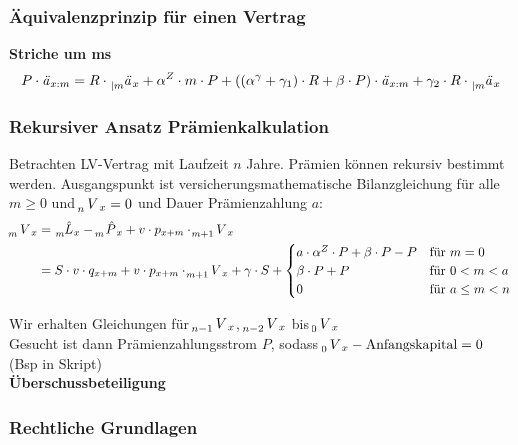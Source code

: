 \documentclass[12pt]{report}
\theoremstyle{dotless}
\theoremstyle{definition}
\begin{document}
\subsubsection{Äquivalenzprinzip für einen Vertrag}
\textbf{Striche um ms}
\begin{equation}
P \cdot \text{\textit{ä}}_{x:m} = R \cdot \tensor[_{|m}]{\text{\textit{ä}}}{}_x + \alpha^Z \cdot m \cdot P + ((\alpha^\gamma + \gamma_1)\cdot R + \beta \cdot P) \cdot \text{\textit{ä}}_{x:m} + \gamma_2 \cdot R \cdot \tensor[_{|m}]{\text{\textit{ä}}}{}_x
\end{equation}

\subsubsection{Rekursiver Ansatz Prämienkalkulation}
Betrachten LV-Vertrag mit Laufzeit $n$ Jahre. Prämien können rekursiv bestimmt werden. Ausgangspunkt ist versicherungsmathematische Bilanzgleichung für alle $m\geq 0$ und $\tensor[_n]{V}{}_x=0$ und Dauer Prämienzahlung $a$:
\begin{equation}
\begin{aligned}
\tensor[_m]{V}{}_x & = \tensor[_m]{\hat{L}}{}_x - \tensor[_m]{\hat{P}}{}_x + v \cdot p_{x+m} \cdot \tensor[_{m+1}]{V}{}_x \\
& =S \cdot v \cdot q_{x+m} + v\cdot p_{x+m} \cdot \tensor[_{m+1}]{V}{}_x + \gamma \cdot S + \begin{cases}
	a \cdot \alpha^Z \cdot P + \beta \cdot P - P & \text{für } m=0 \\
	\beta \cdot P + P & \text{für } 0<m< a \\
	0 & \text{für } a\leq m < n
	\end{cases}
\end{aligned}
\end{equation}

Wir erhalten Gleichungen für $\tensor[_{n-1}]{V}{}_x$, $\tensor[_{n-2}]{V}{}_x$ bis $ \tensor[_0]{V}{}_x$ \\
Gesucht ist dann Prämienzahlungsstrom $P$, sodass $\tensor[_0]{V}{}_x - \text{Anfangskapital} =0$ (Bsp in Skript)\\

\large \textbf{Überschussbeteiligung}
\normalsize 
\subsubsection{Rechtliche Grundlagen}
\end{document}
